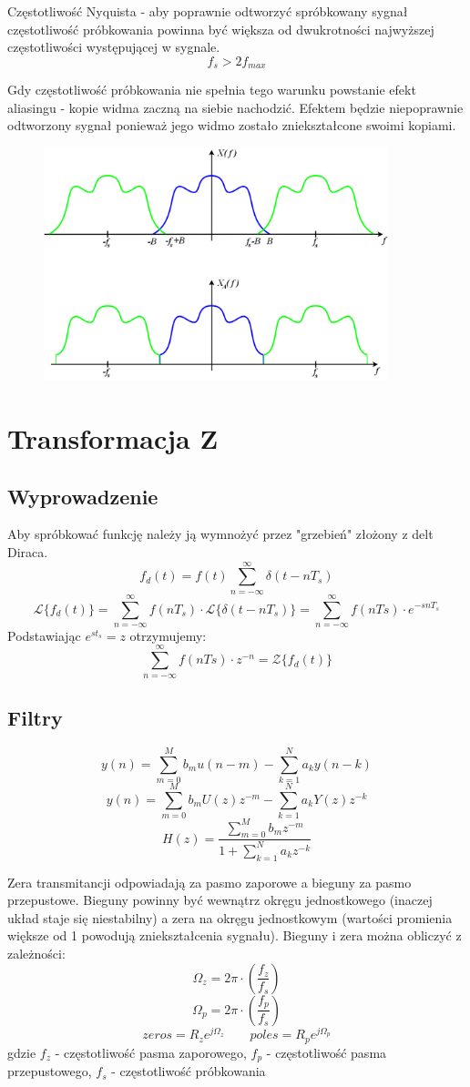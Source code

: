 \documentclass[11pt]{article}
\begin{document}
Częstotliwość Nyquista - aby poprawnie odtworzyć spróbkowany sygnał częstotliwość próbkowania powinna być większa od dwukrotności najwyższej częstotliwości występującej w sygnale.
\[ f_s > 2f_{max} \]

Gdy częstotliwość próbkowania nie spełnia tego warunku powstanie efekt aliasingu - kopie widma zaczną na siebie nachodzić. Efektem będzie niepoprawnie odtworzony sygnał ponieważ jego widmo zostało zniekształcone swoimi kopiami.
\begin{figure}[h]
    \centering
    \includegraphics[width=10cm]{aliasing.png}
\end{figure}

\section{Transformacja Z}
\subsection{Wyprowadzenie}
Aby spróbkować funkcję należy ją wymnożyć przez "grzebień" złożony z delt Diraca.
\[ f_d(t) = f(t)\sum_{n=-\infty}^{\infty}\delta (t-nT_s) \]
\[ \mathcal{L} \{f_d(t)\}=\sum_{n=-\infty}^{\infty}f(nT_s) \cdot \mathcal{L} \{\delta (t-nT_s)\} =\sum_{n=-\infty}^{\infty} f(nTs)\cdot e^{-snT_s} \]
Podstawiając $ e^{st_s} = z $ otrzymujemy:
\[ \sum_{n=-\infty}^{\infty} f(nTs)\cdot z^{-n} = \mathcal{Z} \{ f_d(t) \} \]
\subsection{Filtry}
\[ y(n) = \sum_{m=0}^{M}b_m u(n-m) - \sum_{k=1}^{N}a_k y(n-k) \]
\[ y(n) = \sum_{m=0}^{M}b_m U(z)z^{-m} - \sum_{k=1}^{N}a_k Y(z)z^{-k} \]
\[ H(z) = \frac{\sum_{m=0}^{M}b_m z^{-m}}{1 + \sum_{k=1}^{N}a_k z^{-k}} \]

Zera transmitancji odpowiadają za pasmo zaporowe a bieguny za pasmo przepustowe. Bieguny powinny być wewnątrz okręgu jednostkowego (inaczej układ staje się niestabilny) a zera na okręgu jednostkowym (wartości promienia większe od 1 powodują zniekształcenia sygnału). Bieguny i zera można obliczyć z zależności:
\[ \Omega_z = 2\pi \cdot \left( \frac{f_z}{f_s} \right) \]
\[ \Omega_p = 2\pi \cdot \left( \frac{f_p}{f_s} \right) \]
\[ zeros = R_z e^{j\Omega_z} \quad\quad poles = R_p e^{j\Omega_p} \]
gdzie $ f_z $ - częstotliwość pasma zaporowego, $ f_p $ - częstotliwość pasma przepustowego, $ f_s $ - częstotliwość próbkowania
\end{document}
